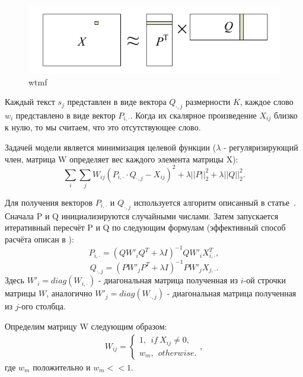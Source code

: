             \begin{figure}[h!]
                \center
                \includegraphics[scale=0.45]{wtmf.png}
                \caption{wtmf}
                \label{pic:wtmf}
            \end{figure}

            Каждый текст $s_j$ представлен в виде вектора $Q_{\cdot,j}$ размерности $K$, каждое слово $w_i$ представлено в виде вектор $P_{i,\cdot}$. Когда их скалярное произведение $X_{ij}$ близко к нулю, то мы считаем, что это отсутствующее слово.

            Задачей модели является минимизация целевой функции ({\color{red}$\lambda$ - регуляризирующий член}, матрица W определяет вес каждого элемента матрицы X):
            $$\sum_i \sum_j W_{ij} (P_{i,\cdot} \cdot Q_{\cdot,j} - X_{ij})^2 + \lambda ||P||^2_2 + \lambda ||Q||^2_2.$$

            Для получения векторов $P_{i,\cdot}$ и $Q_{\cdot,j}$ используется алгоритм описанный в статье~\cite{matrix_approximation}. Сначала P и Q инициализируются случайными числами. Затем запускается итеративный пересчёт P и Q по следующим формулам (эффективный способ расчёта описан в \cite{steck_recommender}):
            $$P_{i, \cdot} = (Q W'_i Q^T + \lambda I)^{-1} Q W'_i X_{i,\cdot}^T,$$
            $$Q_{\cdot, j} = (P W'_j P^T + \lambda I)^{-1} P W'_j X_{j,\cdot}.$$
            Здесь $W'_i = diag(W_{i, \cdot})$ - диагональная матрица полученная из $i$-ой строчки матрицы $W$, аналогично $W'_j = diag(W_{\cdot, j})$ - диагональная матрица полученная из $j$-ого столбца.

            Определим матрицу W следующим образом:
            \begin{gather}
                W_{ij} = 
                \begin{cases}
                    1, ~~if~X_{ij} \neq 0, \nonumber \\
                    w_m, ~~otherwise. 
                \end{cases},
            \end{gather}
            где $w_m$ положительно и $w_m << 1$.

